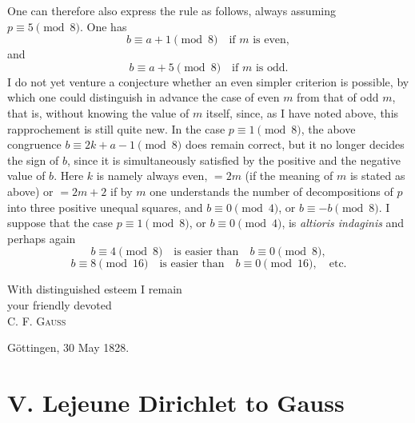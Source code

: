 \documentclass[11pt]{article}
\newcommand{\scn}[1]{\textsc{#1}}
\begin{document}
One can therefore also express the rule as follows, always assuming $p\equiv5\pmod8$. One has
\[
 b\equiv a+1\pmod8\quad\text{if }m\text{ is even},
\]
and
\[
 b\equiv a+5\pmod8\quad\text{if }m\text{ is odd}.
\]
I do not yet venture a conjecture whether an even simpler criterion is possible, by which one could distinguish in advance the case of even $m$ from that of odd $m$, that is, without knowing the value of $m$ itself, since, as I have noted above, this rapprochement is still quite new. In the case $p\equiv1\pmod8$, the above congruence $b\equiv2k+a-1\pmod8$ does remain correct, but it no longer decides the sign of $b$, since it is simultaneously satisfied by the positive and the negative value of $b$. Here $k$ is namely always even, $=2m$ (if the meaning of $m$ is stated as above) or $=2m+2$ if by $m$ one understands the number of decompositions of $p$ into three positive unequal squares, and $b\equiv0\pmod4$, or $b\equiv -b\pmod8$. I suppose that the case $p\equiv1\pmod8$, or $b\equiv0\pmod4$, is \emph{altioris indaginis} and perhaps again
\[
 b\equiv4\pmod8 \quad \text{is easier than}\quad b\equiv0\pmod8,
\]
\[
 b\equiv8\pmod{16}\quad \text{is easier than}\quad b\equiv0\pmod{16},\quad\text{etc.}
\]

\begin{flushright}
With distinguished esteem I remain\\
your friendly devoted\\
\scn{C. F. Gauss}
\end{flushright}
Göttingen, 30 May 1828.

\section*{V. Lejeune Dirichlet to Gauss}
\end{document}
